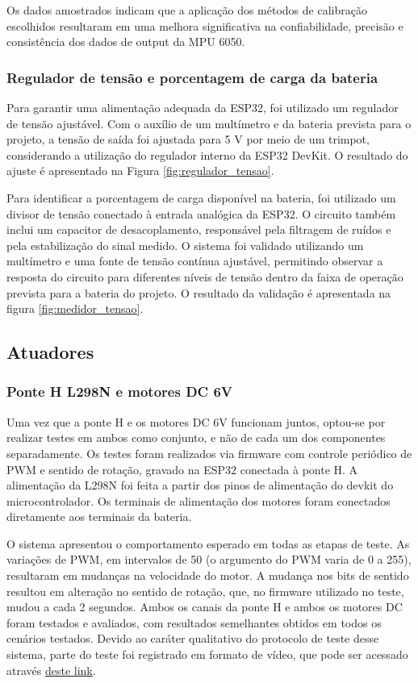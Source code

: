 Os dados amostrados indicam que a aplicação dos métodos de calibração escolhidos resultaram em uma melhora significativa na confiabilidade, precisão e consistência dos dados de output da MPU 6050.

\subsubsection{Regulador de tensão e porcentagem de carga da bateria}
Para garantir uma alimentação adequada da ESP32, foi utilizado um regulador de tensão ajustável. Com o auxílio de um multímetro e da bateria prevista para o projeto, a tensão de saída foi ajustada para 5 V por meio de um trimpot, considerando a utilização do regulador interno da ESP32 DevKit. O resultado do ajuste é apresentado na Figura \ref{fig:regulador_tensao}.

Para identificar a porcentagem de carga disponível na bateria, foi utilizado um divisor de tensão conectado à entrada analógica da ESP32. O circuito também inclui um capacitor de desacoplamento, responsável pela filtragem de ruídos e pela estabilização do sinal medido. O sistema foi validado utilizando um multímetro e uma fonte de tensão contínua ajustável, permitindo observar a resposta do circuito para diferentes níveis de tensão dentro da faixa de operação prevista para a bateria do projeto. O resultado da validação é apresentada na figura \ref{fig:medidor_tensao}. 


\subsection{Atuadores}
\subsubsection{Ponte H L298N e motores DC 6V}
Uma vez que a ponte H e os motores DC 6V funcionam juntos, optou-se por realizar testes em ambos como conjunto, e não de cada um dos componentes separadamente. Os testes foram realizados via firmware com controle periódico de PWM e sentido de rotação, gravado na ESP32 conectada à ponte H. A alimentação da L298N foi feita a partir dos pinos de alimentação do devkit do microcontrolador. Os terminais de alimentação dos motores foram conectados diretamente aos terminais da bateria. 

O sistema apresentou o comportamento esperado em todas as etapas de teste. As variações de PWM, em intervalos de 50 (o argumento do PWM varia de 0 a 255), resultaram em mudanças na velocidade do motor. A mudança nos bits de sentido resultou em alteração no sentido de rotação, que, no firmware utilizado no teste, mudou a cada 2 segundos. Ambos os canais da ponte H e ambos os motores DC foram testados e avaliados, com resultados semelhantes obtidos em todos os cenários testados. Devido ao caráter qualitativo do protocolo de teste desse sistema, parte do teste foi registrado em formato de vídeo, que pode ser acessado através \href{https://unbbr-my.sharepoint.com/:f:/g/personal/231027079_aluno_unb_br/IgBTkERhmse0RpFUGiqooULzAQvzFr9VL5YGq6soeIDkyNI?e=624aZd}{deste link}.

